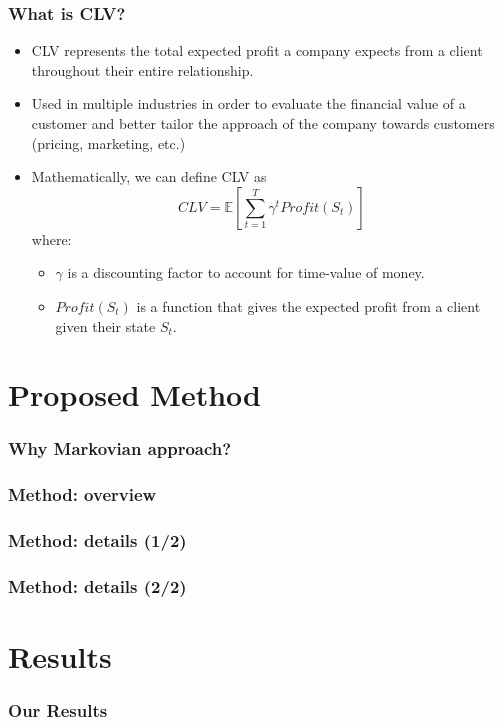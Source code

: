 \documentclass[aspectratio=169,xcolor=x11names,compress]{beamer}
\newcommand{\E}{\mathbb{E}}
\begin{document}
\begin{frame}
\frametitle{What is CLV?}

\begin{itemize}
    \item CLV represents the total expected profit a
    company expects from a client throughout their entire relationship. \pause
    \item Used in multiple industries in order to evaluate the financial value of a
    customer and better tailor the approach of the company towards
    customers (pricing, marketing, etc.) 

\item Mathematically, we can define CLV as
\[
CLV = \E[\sum_{t=1}^T \gamma^t Profit(S_t)]
\]
where:
\begin{itemize}
    \item $\gamma$ is a discounting factor to account for time-value of money.
    \item $Profit(S_t)$ is a function that gives the expected profit from a client given their state $S_t$.
\end{itemize}

\end{itemize}

\end{frame}

\section{Proposed Method}

\begin{frame}
\frametitle{Why Markovian approach?}
\end{frame}

\begin{frame}
\frametitle{Method: overview}
\end{frame}

\begin{frame}
\frametitle{Method: details (1/2)}
\end{frame}

\begin{frame}
\frametitle{Method: details (2/2)}
\end{frame}

\section{Results}

\begin{frame}
\frametitle{Our Results}
\end{frame}
\end{document}
